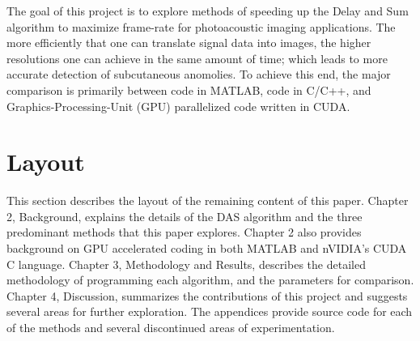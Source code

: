 The goal of this project is to explore methods of speeding up the Delay and Sum algorithm to maximize frame-rate for photoacoustic imaging applications. The more efficiently that one can translate signal data into images, the higher resolutions one can achieve in the same amount of time; which leads to more accurate detection of subcutaneous anomolies. To achieve this end, the major comparison is primarily between code in MATLAB, code in C/C++, and Graphics-Processing-Unit (GPU) parallelized code written in CUDA.

\section{Layout}
\label{chapter1:layout}

This section describes the layout of the remaining content of this paper. Chapter 2, Background, explains the details of the DAS algorithm and the three predominant methods that this paper explores. Chapter 2 also provides background on GPU accelerated coding in both MATLAB and nVIDIA's CUDA C language. Chapter 3, Methodology and Results, describes the detailed methodology of programming each algorithm, and the parameters for comparison. Chapter 4, Discussion, summarizes the contributions of this project and suggests several areas for further exploration. The appendices provide source code for each of the methods and several discontinued areas of experimentation.
